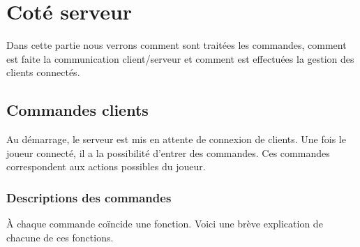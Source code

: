 \documentclass[a4paper,10pt]{article}
\begin{document}


	\newpage
	\section{Coté serveur}
	Dans cette partie nous verrons comment sont traitées les commandes, comment est faite la communication client/serveur et comment est effectuées la gestion
des clients connectés.

	\subsection{Commandes clients}
	Au démarrage, le serveur est mis en attente de connexion de clients.
	Une fois le joueur connecté, il a la possibilité d'entrer des commandes. Ces commandes correspondent aux actions possibles du joueur.
	\subsubsection{Descriptions des commandes}
	À chaque commande coïncide une fonction. Voici une brève explication de chacune de ces fonctions.
\end{document}
